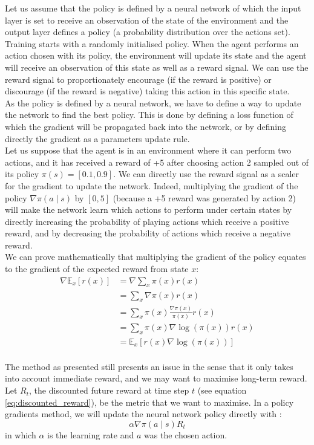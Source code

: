 Let us assume that the
policy is defined by a neural network of which the input layer is set to 
receive an observation of the state of the environment and the output layer
defines a policy (a probability distribution over the actions set).
Training starts with a randomly initialised policy. 
When the agent performs an action chosen with its policy, the environment will
update its state and the agent will receive an observation of this state as
well as a reward signal. We can use the reward signal to proportionately
encourage (if the reward is 
positive) or discourage (if the reward is negative) taking this action in 
this specific state.\\

As the policy is defined by a neural network, we have to define a way to
update the network to find the best policy. This is done by defining a loss
function of which the gradient will be propagated back into the network, or
by defining directly the gradient as a parameters update rule.\\

Let us suppose that the agent is in an environment where it can perform two
actions, and it has received a reward of +5 after choosing action 2
sampled out of its policy $\pi(s) = [0.1, 0.9]$. We can directly use the
reward signal as a scaler for the gradient to update the network. Indeed,
multiplying the gradient of the policy $\nabla \pi(a \mid s)$ by 
$[0, 5]$ (because a +5 reward was generated by action 2) will make the network
learn which actions to perform under certain states by directly increasing the
probability of playing actions which receive a positive reward, and by
decreasing the probability of actions which receive a negative reward.\\

We can prove mathematically that multiplying the gradient of the policy
equates to the gradient of the expected reward from state $x$:
\begin{align*}
	\nabla \mathbb{E}_x[r(x)] &= \nabla \sum\limits_x\pi(x)r(x)\\
	&=  \sum\limits_x \nabla\pi(x)r(x)\\
	&=  \sum\limits_x \pi(x)\frac{\nabla\pi(x)}{\pi(x)}r(x)\\
	&=  \sum\limits_x \pi(x)\nabla\log(\pi(x))r(x)\\
	&=  \mathbb{E}_x[r(x)\nabla\log(\pi(x))]\\
\end{align*}

The method as presented still presents an issue in the sense that it only takes
into account immediate reward, and we may want to maximise long-term reward.
Let $R_t$, the discounted future reward at time step $t$ (see equation 
\ref{eq:discounted_reward}), be the metric
that we want to maximise. In a policy gradients method, we will update the
neural network policy directly with :
\begin{equation}
	\label{eq:policy_update_rule}
	\alpha \nabla \pi(a \mid s) R_t
\end{equation}
in which $\alpha$ is the learning rate and $a$ was the chosen action.

